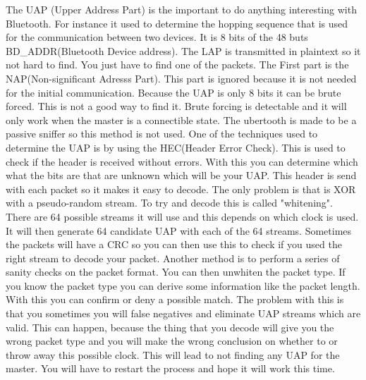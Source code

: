 The UAP (Upper Address Part) is the important to do anything interesting with Bluetooth. For instance it used to determine the hopping sequence that is used for the communication between two devices. It is 8 bits of the 48 buts BD_ADDR(Bluetooth Device address). The LAP is transmitted in plaintext so it not hard to find. You just have to find one of the packets. The First part is the NAP(Non-significant Adresss Part). This part is ignored because it is not needed for the initial communication. Because the UAP is only 8 bits it can be brute forced. This is not a good way to find it. Brute forcing is detectable and it will only work when the master is a connectible state. 
The ubertooth is made to be a passive sniffer so this method is not used. One of the techniques used to determine the UAP is by using the HEC(Header Error Check). This is used to check if the header is received without errors. With this you can determine which what the bits are that are unknown which will be your UAP. This header is send with each packet so it makes it easy to decode. The only problem is that is XOR with a pseudo-random stream. To try and decode this is called "whitening". There are 64 possible streams it will use and this depends on which clock is used. It will then generate 64 candidate UAP with each of the 64 streams. Sometimes the packets will have a CRC so you can then use this to check if you used the right stream to decode your packet.
Another method is to perform a series of sanity checks on the packet format. You can then unwhiten the packet type. If you know the packet type you can derive some information like the packet length. With this you can confirm or deny a possible match. The problem with this is that you sometimes you will false negatives and eliminate UAP streams which are valid. This can happen, because the thing that you decode will give you the wrong packet type and you will make the wrong conclusion on whether to or throw away this possible clock. This will lead to not finding any UAP for the master. You will have to restart the process and hope it will work this time.